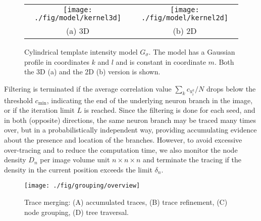 \begin{figure}
\begin{tabular}{@{}c@{\ }c@{}}
\texttt{[image: ./fig/model/kernel3d]} &
\texttt{[image: ./fig/model/kernel2d]} \\
(a) 3D  & (b)  2D
\end{tabular}
\caption{Cylindrical template intensity model $G_{\sigma}$. The model has a Gaussian profile in coordinates $k$ and $l$ and is constant in coordinate $m$. Both the 3D (a) and the 2D (b) version is shown.}
\label{fig:model}
\end{figure}

Filtering is terminated if the average correlation value $\sum_{k} c_{\mathrm{x}_i^k}/N$ drops below the threshold $c_{\text{min}}$, indicating the end of the underlying neuron branch in the image, or if the iteration limit $L$ is reached. Since the filtering is done for each seed, and in both (opposite) directions, the same neuron branch may be traced many times over, but in a probabilistically independent way, providing accumulating evidence about the presence and location of the branches. However, to avoid excessive over-tracing and to reduce the computation time, we also monitor the node density $D_n$ per image volume unit $n \times n \times n$ and terminate the tracing if the density in the current position exceeds the limit $\delta_n$.

\begin{figure}[b!]
\texttt{[image: ./fig/grouping/overview]}
\caption{Trace merging: (A) accumulated traces, (B) trace refinement, (C) node grouping, (D) tree traversal.}
\label{fig:merging}
\end{figure}

